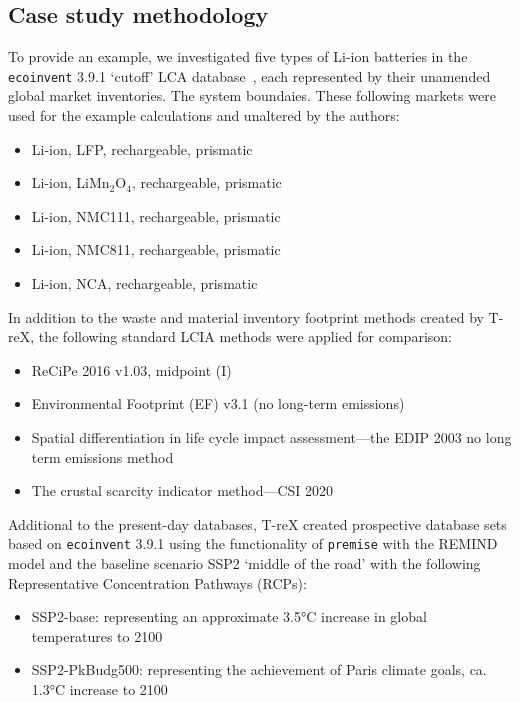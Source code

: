 \documentclass[a4paper,fleqn,longmktitle]{cas-dc}
\begin{document}
\subsection{Case study methodology}\label{sec:method-casestudy}

To provide an example, we investigated five types of Li-ion batteries in the \texttt{ecoinvent} 3.9.1 `cutoff' LCA database~\citep{ecoinvent2016version3}, each represented by their unamended global market inventories. The system boundaies. These following markets were used for the example calculations and unaltered by the authors:
\begin{itemize}[itemsep=0pt]
    \item Li-ion, LFP, rechargeable, prismatic
    \item Li-ion, LiMn\(_2\)O\(_4\), rechargeable, prismatic
    \item Li-ion, NMC111, rechargeable, prismatic
    \item Li-ion, NMC811, rechargeable, prismatic
    \item Li-ion, NCA, rechargeable, prismatic
\end{itemize}

In addition to the waste and material inventory footprint methods created by T-reX, the following standard LCIA methods were applied for comparison:

\begin{itemize}[itemsep=0pt]
    \item ReCiPe 2016 v1.03, midpoint (I)~\citep{huijbregts2016recipe}
    \item Environmental Footprint (EF) v3.1 (no long-term emissions)~\citep{eu2023ef}
    \item Spatial differentiation in life cycle impact assessment---the EDIP 2003 no long term emissions method~\citep{hauschild2003edip}
    \item The crustal scarcity indicator method---CSI 2020~\citep{arvidsson2020csi}
\end{itemize}

Additional to the present-day databases, T-reX created prospective database sets based on \texttt{ecoinvent} 3.9.1 using the functionality of \texttt{premise} with the REMIND model and the baseline scenario SSP2 `middle of the road' with the following Representative Concentration Pathways (RCPs):
\begin{itemize}
    \item SSP2-base: representing an approximate 3.5°C increase in global temperatures to 2100
    \item SSP2-PkBudg500: representing the achievement of Paris climate goals, ca. 1.3°C increase to 2100
\end{itemize}
\end{document}
